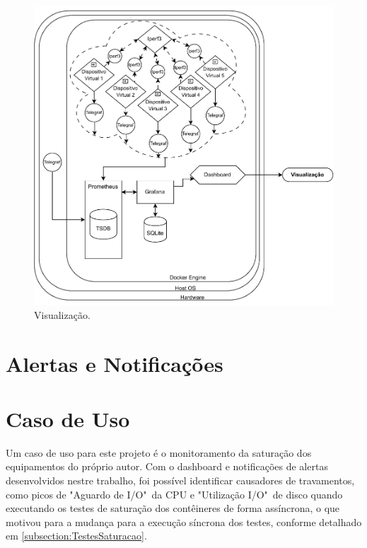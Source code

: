 {\begin{figure}[ht]
\centering
\setlength{\abovecaptionskip}{-20pt}
\includegraphics[width=\textwidth]{Imagens/chap04/by-blocks/dashboard_diagram.pdf}
\caption{Visualização.}
\label{fig:DiagramaVisualizacao}
\end{figure}


}

\section{Alertas e Notificações}
\label{section:Alertas}


{\color{red}
\section{Caso de Uso}
\label{section:CasosDeUso}

Um caso de uso para este projeto é o monitoramento da saturação dos equipamentos do próprio autor. Com o dashboard e notificações de alertas desenvolvidos nestre trabalho, foi possível identificar causadores de travamentos, como picos de "Aguardo de I/O"\ da CPU e "Utilização I/O"\ de disco quando executando os testes de saturação dos contêineres de forma assíncrona, o que motivou para a mudança para a execução síncrona dos testes, conforme detalhado em \ref{subsection:TestesSaturacao}. 
}

